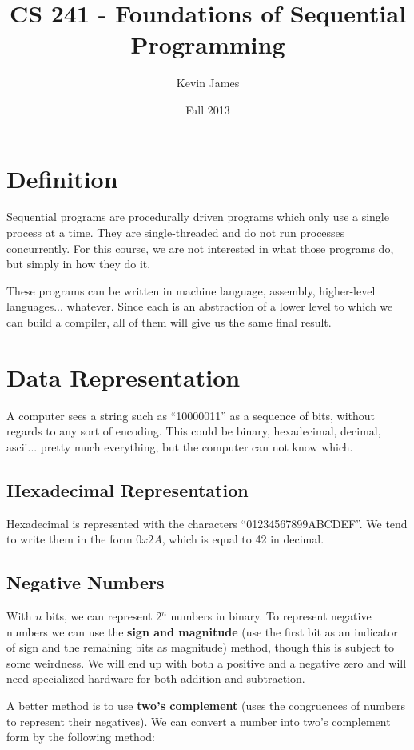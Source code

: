 \documentclass[12pt]{article}
\begin{document}
\title{CS 241 - Foundations of Sequential Programming}
\author{Kevin James}
\date{\vspace{-2ex}Fall 2013}
\maketitle\HRule

\section*{Definition}
Sequential programs are procedurally driven programs which only use a single process at a time. They are single-threaded and do not run processes concurrently. For this course, we are not interested in what those programs do, but simply in how they do it.

These programs can be written in machine language, assembly, higher-level languages... whatever. Since each is an abstraction of a lower level to which we can build a compiler, all of them will give us the same final result.

\section*{Data Representation}
A computer sees a string such as ``10000011'' as a sequence of bits, without regards to any sort of encoding. This could be binary, hexadecimal, decimal, ascii... pretty much everything, but the computer can not know which.

\subsection*{Hexadecimal Representation}
Hexadecimal is represented with the characters ``01234567899ABCDEF''. We tend to write them in the form $0x2A$, which is equal to 42 in decimal.

\subsection*{Negative Numbers}
With $n$ bits, we can represent $2^n$ numbers in binary. To represent negative numbers we can use the {\bf sign and magnitude} (use the first bit as an indicator of sign and the remaining bits as magnitude) method, though this is subject to some weirdness. We will end up with both a positive and a negative zero and will need specialized hardware for both addition and subtraction.

A better method is to use {\bf two's complement} (uses the congruences of numbers to represent their negatives). We can convert a number into two's complement form by the following method:
\end{document}
